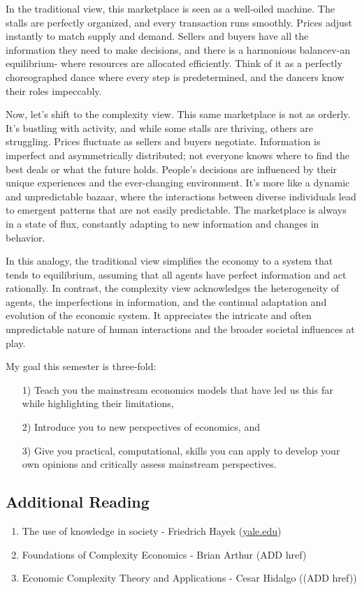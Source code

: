 \documentclass[10pt]{article}
\begin{document}
In the traditional view, this marketplace is seen as a well-oiled machine. The stalls are perfectly organized, and every transaction runs smoothly. Prices adjust instantly to match supply and demand. Sellers and buyers have all the information they need to make decisions, and there is a harmonious balancev-an equilibrium- where resources are allocated efficiently. Think of it as a perfectly choreographed dance where every step is predetermined, and the dancers know their roles impeccably.

Now, let's shift to the complexity view. This same marketplace is not as orderly. It's bustling with activity, and while some stalls are thriving, others are struggling. Prices fluctuate as sellers and buyers negotiate. Information is imperfect and asymmetrically distributed; not everyone knows where to find the best deals or what the future holds. People's decisions are influenced by their unique experiences and the ever-changing environment. It's more like a dynamic and unpredictable bazaar, where the interactions between diverse individuals lead to emergent patterns that are not easily predictable. The marketplace is always in a state of flux, constantly adapting to new information and changes in behavior.

In this analogy, the traditional view simplifies the economy to a system that tends to equilibrium, assuming that all agents have perfect information and act rationally. In contrast, the complexity view acknowledges the heterogeneity of agents, the imperfections in information, and the continual adaptation and evolution of the economic system. It appreciates the intricate and often unpredictable nature of human interactions and the broader societal influences at play.

My goal this semester is three-fold: 

\begin{enumerate}
  \item[1)] Teach you the mainstream economics models that have led us this far while highlighting their limitations, 
  \item[2)] Introduce you to new perspectives of economics, and 
  \item[3)] Give you practical, computational, skills you can apply to develop your own opinions and critically assess mainstream perspectives.
\end{enumerate}

\subsection*{Additional Reading}
\begin{enumerate}
  \item The use of knowledge in society - Friedrich Hayek (\href{http://yale.edu}{yale.edu})
  \item Foundations of Complexity Economics - Brian Arthur (ADD href)
  \item Economic Complexity Theory and Applications - Cesar Hidalgo ((ADD href))
\end{enumerate}
\end{document}
